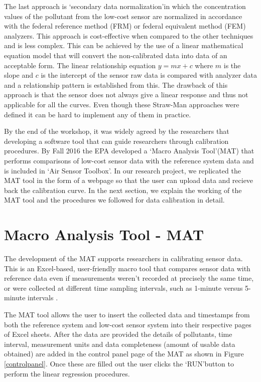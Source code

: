 The last approach is \lq{secondary data normalization}\rq in which the concentration values of the pollutant from the low-cost sensor are normalized in accordance with the federal reference method (FRM) or federal equivalent method (FEM) analyzers. This approach is cost-effective when compared to the other techniques and is less complex. This can be achieved by the use of a linear mathematical equation model that will convert the non-calibrated data into data of an acceptable form. The linear relationship equation $ y = mx + c $ where $ m $ is the slope and $ c $ is the intercept of the sensor raw data is compared with analyzer data and a relationship pattern is established from this. The drawback of this approach is that the sensor does not always give a linear response and thus not applicable for all the curves. Even though these Straw-Man approaches were defined it can be hard to implement any of them in practice. 

By the end of the workshop, it was widely agreed by the researchers that developing a software tool that can guide researchers through calibration procedures. By Fall 2016 the EPA developed a \lq{Macro Analysis Tool}\rq (MAT) that performs comparisons of low-cost sensor data with the reference system data and is included in \lq{Air Sensor Toolbox}\rq \cite{airsensortoolbox}.  In our research project, we replicated the MAT tool in the form of a webpage so that the user can upload data and recieve back the calibration curve. In the next section, we explain the working of the MAT tool and the procedures we followed for data calibration in detail.


\section{Macro Analysis Tool - MAT}


The development of the MAT supports researchers in calibrating sensor data. This is an Excel-based, user-friendly macro tool that compares sensor data with reference data \cite{National2017} even if measurements weren’t recorded at precisely the same time, or were collected at different time sampling intervals, such as 1-minute versus 5-minute intervals \cite{mattool}. 

The MAT tool allows the user to insert the collected data and timestamps from both the reference system and low-cost sensor system into their respective pages of Excel sheets.
After the data are provided the details of pollutants, time interval, measurement units and data completeness (amount of usable data obtained) are added in the control panel page of the MAT as shown in Figure \ref{controlpanel}. Once these are filled out the user clicks the \lq{RUN}\rq button to perform the linear regression procedures.


